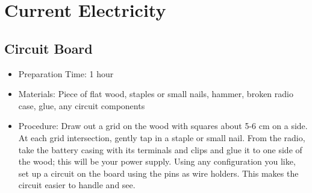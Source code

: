 \section{Current Electricity}

\subsection{Circuit Board}
\begin{itemize}
\item{Preparation Time: 1 hour}
\item{Materials: Piece of flat wood, staples or small nails, hammer, broken radio case, glue, any circuit components}
\item{Procedure: Draw out a grid on the wood with squares about 5-6 cm on a side. At each grid intersection, gently tap in a staple or small nail. From the radio, take the battery casing with its terminals and clips and glue it to one side of the wood; this will be your power supply. Using any configuration you like, set up a circuit on the board using the pins as wire holders. This makes the circuit easier to handle and see.}
\end{itemize}


